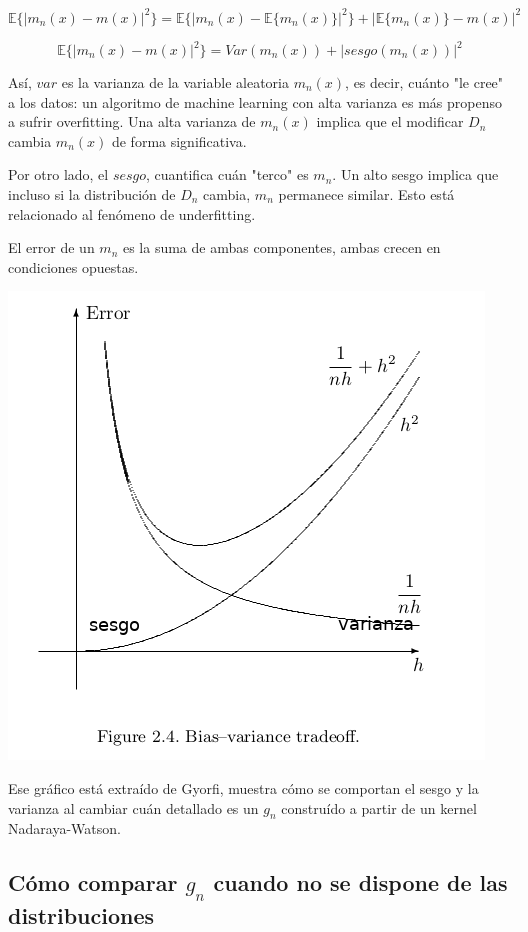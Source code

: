 \documentclass[12pt, a4paper]{article}
\begin{document}
$$ \mathds{E} \Big \{ |m_n(x)-m(x)|^2 \Big \} = \mathds{E} \Big \{ | m_n(x) - \mathds{E} \big \{ m_n(x) \big \} |^2  \Big \} + \Big | \mathds{E} \big \{m_n(x) \big \} -m(x) \Big |^2$$

$$ \mathds{E} \Big \{ |m_n(x)-m(x)|^2 \Big \} = Var(m_n(x)) + |sesgo(m_n(x))|^2 $$

Así, $var$ es la varianza de la variable aleatoria $m_n(x)$, es decir, cuánto "le cree" a los datos: un algoritmo de machine learning con alta varianza es más propenso a sufrir overfitting. Una alta varianza de $m_n(x)$ implica que el modificar $D_n$ cambia $m_n(x)$ de forma significativa.

Por otro lado, el $sesgo$, cuantifica cuán "terco" es $m_n$. Un alto sesgo implica que incluso si la distribución de $D_n$ cambia, $m_n$ permanece similar. Esto está relacionado al fenómeno de underfitting.

El error de un $m_n$ es la suma de ambas componentes, ambas crecen en condiciones opuestas. 

\includegraphics[scale=0.65]{bias-variance.png}

Ese gráfico está extraído de Gyorfi, muestra cómo se comportan el sesgo y la varianza al cambiar cuán detallado es un $g_n$ construído a partir de un kernel Nadaraya-Watson.

\subsection{Cómo comparar $g_n$ cuando no se dispone de las distribuciones}
\end{document}
